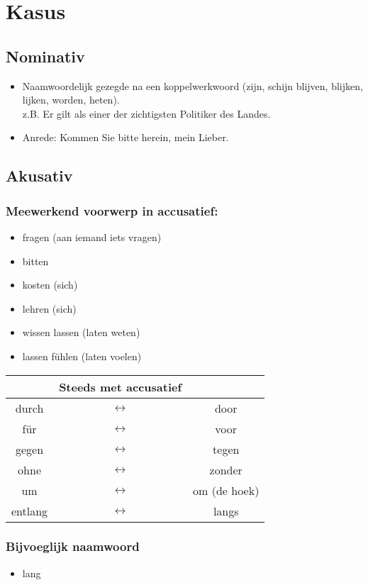 \documentclass[main.tex]{subfiles}
\begin{document}
\chapter{Kasus}


\section{Nominativ}
\begin{itemize}
\item Naamwoordelijk gezegde na een koppelwerkwoord (zijn, schijn blijven, blijken, lijken, worden, heten).\\
z.B. Er gilt als einer der zichtigsten Politiker des Landes.
\item Anrede: Kommen Sie bitte herein, mein Lieber.
\end{itemize}
\section{Akusativ}
\subsection{Meewerkend voorwerp in accusatief:}
\begin{itemize}
\item fragen (aan iemand iets vragen)
\item bitten 
\item kosten (sich)
\item lehren (sich)
\item wissen lassen (laten weten)
\item lassen fühlen (laten voelen)
\end{itemize}

\begin{tabular}{ccc}
 & Steeds met accusatief &  \\ 
\hline
durch & $\leftrightarrow$ & door \\ 
für & $\leftrightarrow$ & voor \\ 
gegen & $\leftrightarrow$ & tegen \\ 
ohne & $\leftrightarrow$ & zonder \\ 
um & $\leftrightarrow$ & om (de hoek) \\ 
entlang & $\leftrightarrow$ & langs \\ 
\end{tabular} 

\subsection{Bijvoeglijk naamwoord}
\begin{itemize}
\item lang
\end{itemize}
\end{document}
